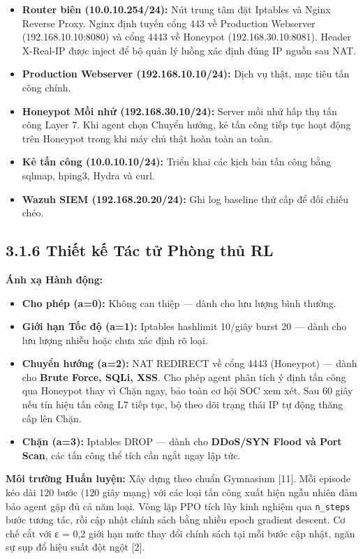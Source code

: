 \documentclass[12pt,a4paper,twoside]{report}
\begin{document}
{\begin{itemize}
\item \textbf{Router biên (10.0.10.254/24):} Nút trung tâm đặt Iptables và Nginx Reverse Proxy. Nginx định tuyến cổng 443 về Production Webserver (192.168.10.10:8080) và cổng 4443 về Honeypot (192.168.30.10:8081). Header X-Real-IP được inject để bộ quản lý luồng xác định đúng IP nguồn sau NAT.
\item \textbf{Production Webserver (192.168.10.10/24):} Dịch vụ thật, mục tiêu tấn công chính.
\item \textbf{Honeypot Mồi nhử (192.168.30.10/24):} Server mồi nhử hấp thụ tấn công Layer 7. Khi agent chọn Chuyển hướng, kẻ tấn công tiếp tục hoạt động trên Honeypot trong khi máy chủ thật hoàn toàn an toàn.
\item \textbf{Kẻ tấn công (10.0.10.10/24):} Triển khai các kịch bản tấn công bằng sqlmap, hping3, Hydra và curl.
\item \textbf{Wazuh SIEM (192.168.20.20/24):} Ghi log baseline thứ cấp để đối chiếu chéo.
\end{itemize}

\subsection{3.1.6 Thiết kế Tác tử Phòng thủ RL}

\textbf{Ánh xạ Hành động:}
\begin{itemize}
\item \textbf{Cho phép (a=0):} Không can thiệp — dành cho lưu lượng bình thường.
\item \textbf{Giới hạn Tốc độ (a=1):} Iptables hashlimit 10/giây burst 20 — dành cho lưu lượng nhiễu hoặc chưa xác định rõ loại.
\item \textbf{Chuyển hướng (a=2):} NAT REDIRECT về cổng 4443 (Honeypot) — dành cho \textbf{Brute Force, SQLi, XSS}. Cho phép agent phân tích ý định tấn công qua Honeypot thay vì Chặn ngay, bảo toàn cơ hội SOC xem xét. Sau 60 giây nếu tín hiệu tấn công L7 tiếp tục, bộ theo dõi trạng thái IP tự động thăng cấp lên Chặn.
\item \textbf{Chặn (a=3):} Iptables DROP — dành cho \textbf{DDoS/SYN Flood và Port Scan}, các tấn công thể tích cần ngắt ngay lập tức.
\end{itemize}

\textbf{Môi trường Huấn luyện:} Xây dựng theo chuẩn Gymnasium [11]. Mỗi episode kéo dài 120 bước (120 giây mạng) với các loại tấn công xuất hiện ngẫu nhiên đảm bảo agent gặp đủ cả năm loại. Vòng lặp PPO tích lũy kinh nghiệm qua \texttt{n_steps} bước tương tác, rồi cập nhật chính sách bằng nhiều epoch gradient descent. Cơ chế cắt với ε = 0,2 giới hạn mức thay đổi chính sách tại mỗi bước cập nhật, ngăn sự sụp đổ hiệu suất đột ngột [2].

}
\end{document}
